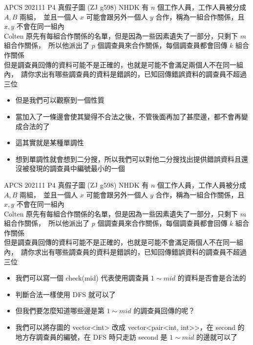 \documentclass[aspectratio=169]{beamer}
\begin{document}
    \begin{frame}
        \begin{block}{APCS 202111 P4 真假子圖 (ZJ g598)}
            NHDK 有 $n$ 個工作人員，工作人員被分成 $A, B$ 兩組，\
            並且一個人 $x$ 可能會跟另外一個人 $y$ 合作，稱為一組合作關係，且 $x, y$ 不會在同一組內\\
            Colten 原先有每組合作關係的名單，但是因為一些因素遺失了一部分，只剩下 $m$ 組合作關係，\
            所以他派出了 $p$ 個調查員來合作關係，每個調查員都會回傳 $k$ 組合作關係\\
            但是調查員回傳的資料可能不是正確的，也就是可能不會滿足兩個人不在同一組內，\
            請你求出有哪些調查員的資料是錯誤的，已知回傳錯誤資料的調查員不超過三位
        \end{block}

        \begin{itemize}
            \item<1-> 但是我們可以觀察到一個性質
            \item<2-> 當加入了一條邊會使其變得不合法之後，不管後面再加了甚麼邊，都不會再變成合法的了
            \item<2-> 這其實就是某種單調性
            \item<3-> 想到單調性就會想到二分搜，所以我們可以對他二分搜找出提供錯誤資料且還沒被發現的調查員中編號最小的一個
        \end{itemize}
    \end{frame}

    \begin{frame}
        \begin{block}{APCS 202111 P4 真假子圖 (ZJ g598)}
            NHDK 有 $n$ 個工作人員，工作人員被分成 $A, B$ 兩組，\
            並且一個人 $x$ 可能會跟另外一個人 $y$ 合作，稱為一組合作關係，且 $x, y$ 不會在同一組內\\
            Colten 原先有每組合作關係的名單，但是因為一些因素遺失了一部分，只剩下 $m$ 組合作關係，\
            所以他派出了 $p$ 個調查員來合作關係，每個調查員都會回傳 $k$ 組合作關係\\
            但是調查員回傳的資料可能不是正確的，也就是可能不會滿足兩個人不在同一組內，\
            請你求出有哪些調查員的資料是錯誤的，已知回傳錯誤資料的調查員不超過三位
        \end{block}

        \begin{itemize}
            \item<1-> 我們可以寫一個 check(mid) 代表使用調查員 $1 \sim mid$ 的資料是否會是合法的
            \item<2-> 判斷合法一樣使用 DFS 就可以了
            \item<3-> 但我們要怎麼知道哪些邊是第 $1 \sim mid$ 的調查員回傳的呢？
            \item<4-> 我們可以將存圖的 vector<int> 改成 vector<pair<int, int>>，在 second 的地方存調查員的編號，在 DFS 時只走訪 second 是 $1 \sim mid$ 的邊就可以了
        \end{itemize}
    \end{frame}
\end{document}
